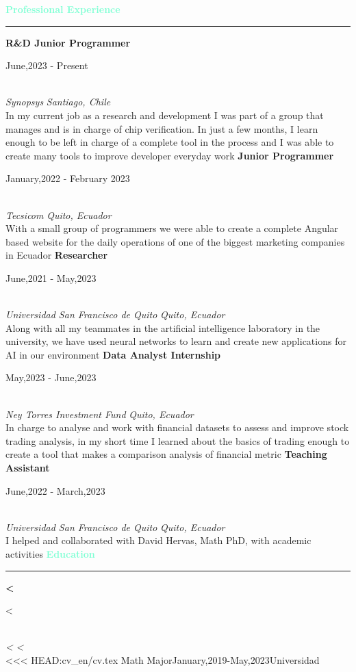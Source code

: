 \documentclass[11pt]{article}
\newenvironment{til}[2]
{
  \large
  \textcolor{Aquamarine}{\textbf{#1}}
  \vspace{0.05in}
  \textcolor{Aquamarine}{\hrule}
}{
  \vspace{0.05in}
}
\newenvironment{itemexp}[5]{
  \textbf{#1} \hfill \begin{scriptsize}#2\end{scriptsize}\\
  \scriptsize\textit{#3} \hfill \textit{#4}\\\normalsize
  \footnotesize #5}{\smallbreak}
\begin{document}
\textcolor{Aquamarine}{\hfill\vline \hfill}
\begin{minipage}[t]{0.61\textwidth}
  \begin{til}{Professional Experience}{1}\end{til}
  \smallbreak
  \begin{itemexp}
    {R\&D Junior Programmer}{June,2023 - Present}{Synopsys}{Santiago, Chile}
    {In my current job as a research and development I was part of a group that
    manages and is in charge of chip verification. In just a few months, I
    learn enough to be left in charge of a complete tool in the process and I
    was able to create many tools to improve developer everyday work}
  \end{itemexp}
  \begin{itemexp}
    {Junior Programmer}{January,2022 - February 2023}{Tecsicom}{Quito, Ecuador}
    {With a small group of programmers we were able to create a complete Angular
    based website for the daily operations of one of the biggest marketing
    companies in Ecuador}
  \end{itemexp}
  \smallbreak
  \begin{itemexp}
    {Researcher}{June,2021 - May,2023}{Universidad
    San Francisco de Quito}{Quito, Ecuador}
    {Along with all my teammates in the artificial intelligence laboratory in
    the university, we have used neural networks to learn and create new
    applications for AI in our environment} 
  \end{itemexp}
  \smallbreak
  \begin{itemexp}
    {Data Analyst Internship}{May,2023 - June,2023}{Ney Torres Investment Fund}{Quito, Ecuador}
    {In charge to analyse and work with financial datasets to assess and improve
    stock trading analysis, in my short time I learned about the basics of trading
    enough to create a tool that makes a comparison analysis of financial metric} 
  \end{itemexp}
  \smallbreak
  \smallbreak
  \begin{itemexp}
    {Teaching Assistant}{June,2022 - March,2023}{Universidad
    San Francisco de Quito}{Quito, Ecuador}
    {I helped and collaborated with David Hervas, Math PhD, with academic
    activities}
  \end{itemexp}
  \smallbreak
  \begin{til}{Education}{1}
  \end{til}
  \smallbreak
  \begin{itemexp}
<<<<<<< HEAD:cv_en/cv.tex
    {Math Major}{January,2019-May,2023}{Universidad
}
\end{itemexp}
\end{minipage}
\end{document}
